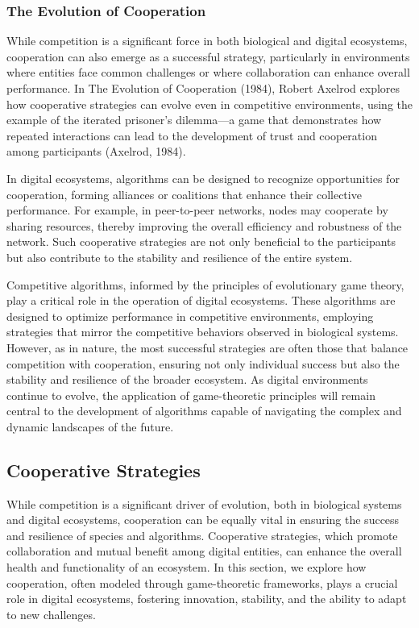\documentclass[12pt,twoside]{article}
\begin{document}
\subsubsection{The Evolution of Cooperation}

While competition is a significant force in both biological and digital ecosystems, cooperation can also emerge as a successful strategy, particularly in environments where entities face common challenges or where collaboration can enhance overall performance. In The Evolution of Cooperation (1984), Robert Axelrod explores how cooperative strategies can evolve even in competitive environments, using the example of the iterated prisoner’s dilemma—a game that demonstrates how repeated interactions can lead to the development of trust and cooperation among participants (Axelrod, 1984).

In digital ecosystems, algorithms can be designed to recognize opportunities for cooperation, forming alliances or coalitions that enhance their collective performance. For example, in peer-to-peer networks, nodes may cooperate by sharing resources, thereby improving the overall efficiency and robustness of the network. Such cooperative strategies are not only beneficial to the participants but also contribute to the stability and resilience of the entire system.

Competitive algorithms, informed by the principles of evolutionary game theory, play a critical role in the operation of digital ecosystems. These algorithms are designed to optimize performance in competitive environments, employing strategies that mirror the competitive behaviors observed in biological systems. However, as in nature, the most successful strategies are often those that balance competition with cooperation, ensuring not only individual success but also the stability and resilience of the broader ecosystem. As digital environments continue to evolve, the application of game-theoretic principles will remain central to the development of algorithms capable of navigating the complex and dynamic landscapes of the future.

\subsection{Cooperative Strategies}

While competition is a significant driver of evolution, both in biological systems and digital ecosystems, cooperation can be equally vital in ensuring the success and resilience of species and algorithms. Cooperative strategies, which promote collaboration and mutual benefit among digital entities, can enhance the overall health and functionality of an ecosystem. In this section, we explore how cooperation, often modeled through game-theoretic frameworks, plays a crucial role in digital ecosystems, fostering innovation, stability, and the ability to adapt to new challenges.
\end{document}
